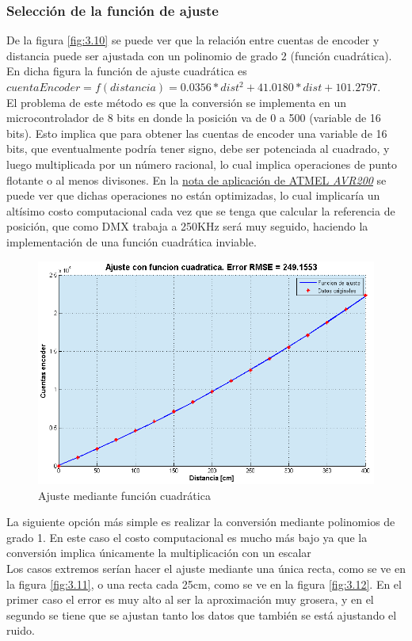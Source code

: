 \subsubsection{Selección de la función de ajuste}
De la figura \ref{fig:3.10} se puede ver que la relación entre cuentas de encoder y distancia puede ser ajustada con un polinomio de grado 2 (función cuadrática). En dicha figura la función de ajuste cuadrática es \(cuentaEncoder = f(distancia) = 0.0356*dist^2 + 41.0180*dist + 101.2797\).\\     
El problema de este método es que la conversión se implementa en un microcontrolador de 8 bits en donde la posición va de 0 a 500 (variable de 16 bits). Esto implica que para obtener las cuentas de encoder una variable de 16 bits, que eventualmente podría tener signo, debe ser potenciada al cuadrado, y luego multiplicada por un número racional, lo cual implica operaciones de punto flotante o al menos divisones. En la \href{http://www.atmel.com/Images/doc0936.pdf}{nota de aplicación de ATMEL \textit{AVR200}} se puede ver que dichas operaciones no están optimizadas, lo cual implicaría un altísimo costo computacional cada vez que se tenga que calcular la referencia de posición, que como DMX trabaja a 250KHz será muy seguido, haciendo la implementación de una función cuadrática inviable. \\

\begin{figure}[!ht]
	\centering
	\includegraphics[width=15cm,scale=1]{resources/3_10-ajusteCuadratico.png}
	\caption{Ajuste mediante función cuadrática}
	\label{fig:\thefigure}
\end{figure}

La siguiente opción más simple es realizar la conversión mediante polinomios de grado 1. En este caso el costo computacional es mucho más bajo ya que la conversión implica únicamente la multiplicación con un escalar \\
Los casos extremos serían hacer el ajuste mediante una única recta, como se ve en la figura \ref{fig:3.11}, o una recta cada 25cm, como se ve en la figura \ref{fig:3.12}. En el primer caso el error es muy alto al ser la aproximación muy grosera, y en el segundo se tiene que se ajustan tanto los datos que también se está ajustando el ruido. \\

